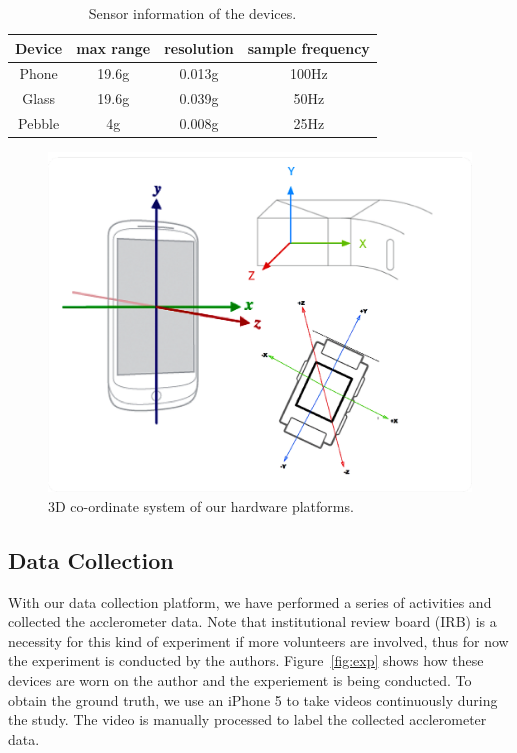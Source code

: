 \begin{table}
  \centering
  \begin{tabular}{c|c|c|c}
    \hline
    Device & max range & resolution & sample frequency \\
    \hline
    Phone  & 19.6g     & 0.013g     & 100Hz  \\
    Glass  & 19.6g     & 0.039g     & 50Hz   \\
    Pebble & 4g        & 0.008g     & 25Hz   \\
    \hline
  \end{tabular}
  \caption{Sensor information of the devices.}
  \label{tab:sensorinfo}
\end{table}

\begin{figure}
  \centering
  \includegraphics[width=0.9\columnwidth]{figures/coordinates.png}
  \caption{3D co-ordinate system of our hardware platforms.}
  \label{fig:coordinate}
\end{figure}

\subsection{Data Collection}
\label{sec:data-collection-2}

With our data collection platform, we have performed a series of activities and collected the acclerometer data. Note that institutional review board (IRB) is a necessity for this kind of experiment if more volunteers are involved, thus for now the experiment is conducted by the authors. Figure~\ref{fig:exp} shows how these devices are worn on the author and the experiement is being conducted. To obtain the ground truth, we use an iPhone 5 to take videos continuously during the study. The video is manually processed to label the collected acclerometer data.

